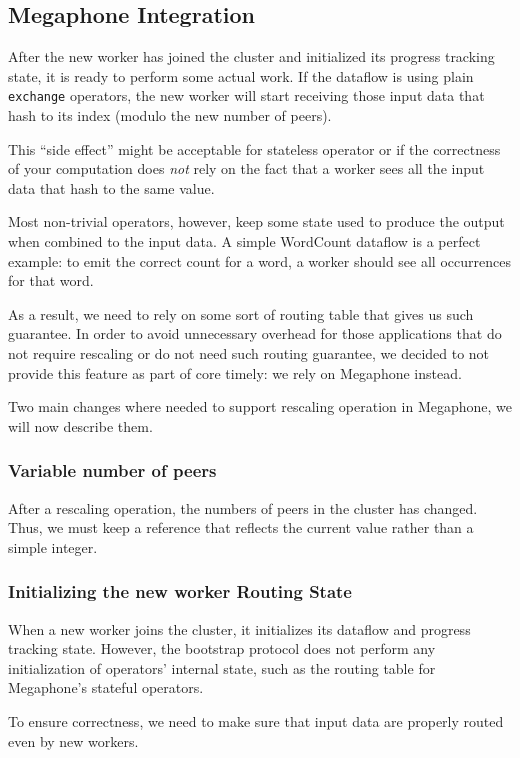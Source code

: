 \documentclass[12pt]{extarticle}
\begin{document}
\subsection{Megaphone Integration}

After the new worker has joined the cluster and initialized its progress tracking state, it is ready to perform some actual
work. If the dataflow is using plain \verb|exchange| operators, the new worker will start receiving those input data
that hash to its index (modulo the new number of peers).

This ``side effect'' might be acceptable for stateless operator or if the correctness of your computation does \textit{not}
rely on the fact that a worker sees all the input data that hash to the same value.

Most non-trivial operators, however, keep some state used to produce the output when combined to the input data.
A simple WordCount dataflow is a perfect example: to emit the correct count for a word,
a worker should see all occurrences for that word.

As a result, we need to rely on some sort of routing table that gives us such guarantee.
In order to avoid unnecessary overhead for those applications that do not require rescaling or do not need such routing
guarantee, we decided to not provide this feature as part of core timely: we rely on Megaphone instead.

Two main changes where needed to support rescaling operation in Megaphone, we will now describe them.

\subsubsection{Variable number of peers}
After a rescaling operation, the numbers of peers in the cluster has changed. Thus, we must keep a reference
that reflects the current value rather than a simple integer.

\subsubsection{Initializing the new worker Routing State}
When a new worker joins the cluster, it initializes its dataflow and progress tracking state.
However, the bootstrap protocol does not perform any initialization of operators' internal state, such as the
routing table for Megaphone's stateful operators.

To ensure correctness, we need to make sure that input data are properly routed even by new workers.
\end{document}
